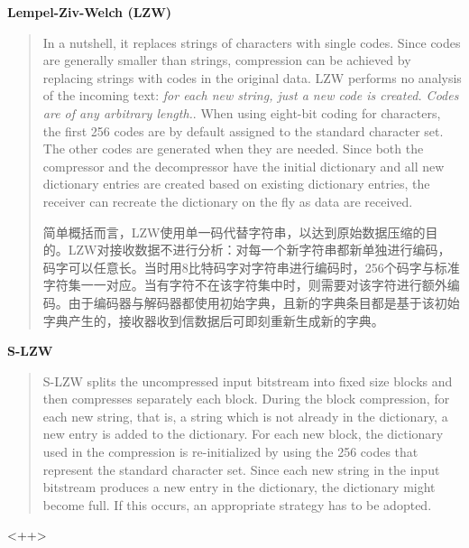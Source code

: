 \textbf{Lempel-Ziv-Welch (LZW)}
\begin{quote}
    In a nutshell, it replaces strings of characters with single codes. Since codes are generally smaller than strings, compression can be achieved by replacing strings with codes in the original data. LZW performs no analysis of the incoming text: \emph{\textcolor[rgb]{1,0,0}{for each new string, just a new code is created. Codes are of any arbitrary length.}}. When using eight-bit coding for characters, the first 256 codes are by default assigned to \textcolor[rgb]{1,0,0}{the standard character set}. The other codes are generated when they are needed. Since both the compressor and the decompressor have the initial dictionary and all new dictionary entries are created based on existing dictionary entries, the receiver can recreate the dictionary on the fly as data are received.

    简单概括而言，LZW使用单一码代替字符串，以达到原始数据压缩的目的。LZW对接收数据不进行分析：对每一个新字符串都新单独进行编码，码字可以任意长。当时用8比特码字对字符串进行编码时，256个码字与标准字符集一一对应。当有字符不在该字符集中时，则需要对该字符进行额外编码。由于编码器与解码器都使用初始字典，且新的字典条目都是基于该初始字典产生的，接收器收到信数据后可即刻重新生成新的字典。
\end{quote}

\textbf{S-LZW}
\begin{quote}
    S-LZW splits the uncompressed input bitstream into fixed size blocks and then compresses separately each block. During the block compression, for each new string, that is, a string which is not already in the dictionary, a new entry is added to the dictionary. For each new block, the dictionary used in the compression is re-initialized by using the 256 codes that represent the standard character set. Since each new string in the input bitstream produces a new entry in the dictionary, the dictionary might become \textcolor[rgb]{0,0,1}{full}. If this occurs, an appropriate strategy has to be adopted.
\end{quote}<++>



